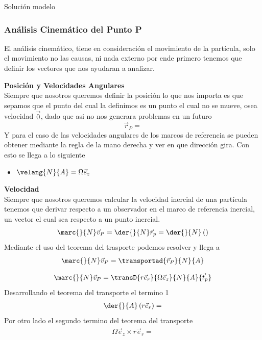 \begin{solucion}{Solución modelo}
\subsubsection*{Análisis Cinemático del Punto P}
        El análisis cinemático, tiene en consideración el movimiento de la partícula, solo el movimiento no las causas, ni nada externo por ende primero tenemos que definir los vectores que nos ayudaran a analizar.

        
        \textbf{Posición y Velocidades Angulares}\\
        Siempre que nosotros queremos definir la posición lo que nos importa es que sepamos que el punto del cual la definimos es un punto el cual no se mueve, osea velocidad $\vec{0}$, dado que asi no nos generara problemas en un futuro
        \begin{equation}
            \vec{r}_P=
        \end{equation}
        Y para el caso de las velocidades angulares de los marcos de referencia se pueden obtener mediante la regla de la mano derecha y ver en que dirección gira. Con esto se llega a lo siguiente
        \begin{itemize}
            \item $\velang{N}{A}=\Omega\vec{e}_z$
        \end{itemize}

        \textbf{Velocidad}\\ %
        Siempre que nosotros queremos calcular la velocidad inercial de una partícula tenemos que derivar respecto a un observador en el marco de referencia inercial, un vector el cual sea respecto a un punto inercial.
        \begin{equation}
            \marc{}{N}\vec{v}_P=\der{}{N}\vec{r}_p=\der{}{N}\left(\right)
        \end{equation}
        Mediante el uso del teorema del trasporte podemos resolver y llega a 
        \begin{equation}
            \marc{}{N}\vec{v}_P=\transportad{\vec{r}_P}{N}{A}
        \end{equation}
        
        
        
        \begin{equation}
            \marc{}{N}\vec{v}_P=\transD{r\vec{e}_r}{\Omega\vec{e}_z}{N}{A}{\vec{t}_p}
        \end{equation}
        Desarrollando el teorema del transporte el termino 1
        \begin{align}
            \der{}{A}\left(r\vec{e}_r\right)=
        \end{align}
        Por otro lado el segundo termino del teorema del transporte
        \begin{align}
            \Omega\vec{e}_z\times r\vec{e}_r=
        \end{align}


\end{solucion}
